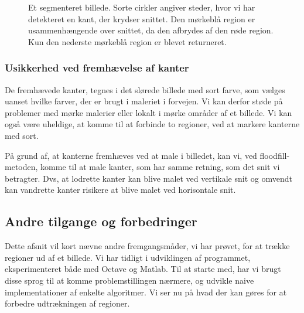 {\begin{figure}[t]
    \setlength\fboxsep{0pt}
    \setlength\fboxrule{0.5pt}
    \centering
    \caption[]{Et segmenteret billede. Sorte cirkler angiver steder,
    hvor vi har detekteret en kant, der krydser snittet. Den mørkeblå
    region er usammenhængende over snittet, da den afbrydes af den røde
    region. Kun den nederste mørkeblå region er blevet returneret.}
    \label{usammenhaengende_region}
\end{figure}

\subsubsection{Usikkerhed ved fremhævelse af kanter}
De fremhævede kanter, tegnes i det slørede billede med sort farve, som
vælges uanset hvilke farver, der er brugt i maleriet i forvejen. Vi kan
derfor støde på problemer med mørke malerier eller lokalt i mørke
områder af et billede. Vi kan også være uheldige, at komme til at
forbinde to regioner, ved at markere kanterne med sort.

På grund af, at kanterne fremhæves ved at male i billedet, kan vi, ved
floodfill-metoden, komme til at male kanter, som har samme retning, som
det snit vi betragter. Dvs, at lodrette kanter kan blive malet ved
vertikale snit og omvendt kan vandrette kanter risikere at blive malet
ved horisontale snit.

\subsection{Andre tilgange og forbedringer}
Dette afsnit vil kort nævne andre fremgangsmåder, vi har prøvet, for at
trække regioner ud af et billede. Vi har tidligt i udviklingen af
programmet, eksperimenteret både med Octave og Matlab. Til at starte
med, har vi brugt disse sprog til at komme problemstillingen nærmere,
og udvikle naive implementationer af enkelte algoritmer. Vi ser nu på
hvad der kan gøres for at forbedre udtrækningen af regioner.

}
